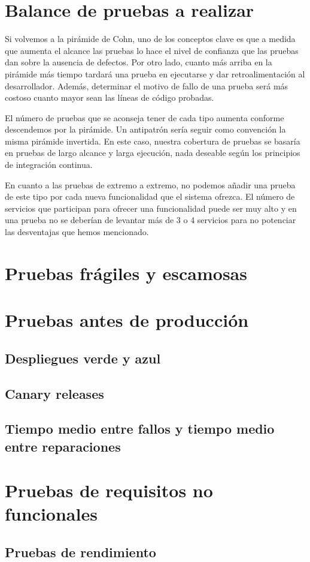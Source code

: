 \documentclass[11pt,a4paper]{article}
\begin{document}
\section{Balance de pruebas a realizar}

Si volvemos a la pirámide de Cohn, uno de los conceptos clave es que a medida que aumenta el alcance las pruebas lo hace el nivel de confianza que las pruebas dan sobre la ausencia de defectos. Por otro lado, cuanto más arriba en la pirámide más tiempo tardará una prueba en ejecutarse y dar retroalimentación al desarrollador. Además, determinar el motivo de fallo de una prueba será más costoso cuanto mayor sean las líneas de código probadas.

El número de pruebas que se aconseja tener de cada tipo aumenta conforme descendemos por la pirámide. Un antipatrón sería seguir como convención la misma pirámide invertida. En este caso, nuestra cobertura de pruebas se basaría en pruebas de largo alcance y larga ejecución, nada deseable según los principios de integración continua.

En cuanto a las pruebas de extremo a extremo, no podemos añadir una prueba de este tipo por cada nueva funcionalidad que el sistema ofrezca. El número de servicios que participan para ofrecer una funcionalidad puede ser muy alto y en una prueba no se deberían de levantar más de 3 o 4 servicios para no potenciar las desventajas que hemos mencionado.

\section{Pruebas frágiles y escamosas}

\section{Pruebas antes de producción}

\subsection{Despliegues verde y azul}

\subsection{Canary releases}

\subsection{Tiempo medio entre fallos y tiempo medio entre reparaciones}

\section{Pruebas de requisitos no funcionales}

\subsection{Pruebas de rendimiento}
\end{document}
